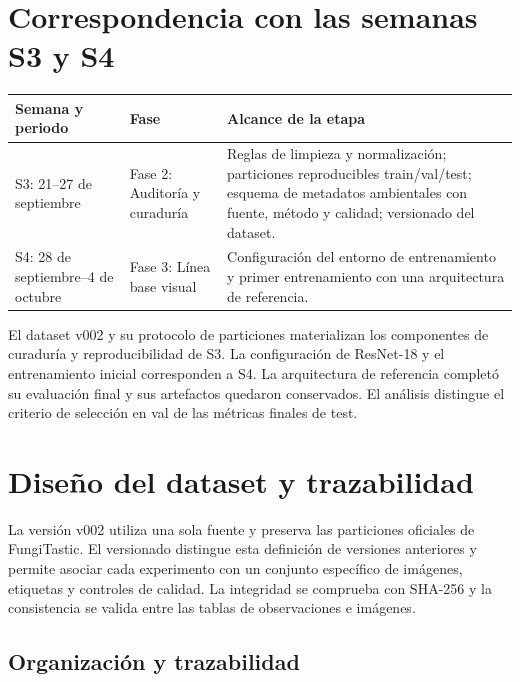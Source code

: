 \documentclass[11pt,a4paper]{article}
\begin{document}
\section{Correspondencia con las semanas S3 y S4}

\begin{center}
\small
\begin{tabularx}{\textwidth}{p{2.7cm}p{3.1cm}Y}
\toprule
\textbf{Semana y periodo} & \textbf{Fase} & \textbf{Alcance de la etapa}\\
\midrule
S3: 21--27 de septiembre & Fase 2: Auditoría y curaduría & Reglas de limpieza y
normalización; particiones reproducibles train/val/test; esquema de metadatos
ambientales con fuente, método y calidad; versionado del dataset.\\
S4: 28 de septiembre--4 de octubre & Fase 3: Línea base visual & Configuración
del entorno de entrenamiento y primer entrenamiento con una arquitectura de referencia.\\
\bottomrule
\end{tabularx}
\end{center}

El dataset v002 y su protocolo de particiones materializan los componentes de
curaduría y reproducibilidad de S3. La configuración de ResNet-18 y el
entrenamiento inicial corresponden a S4. La arquitectura de referencia completó
su evaluación final y sus artefactos quedaron conservados. El análisis distingue
el criterio de selección en val de las métricas finales de test.

\section{Diseño del dataset y trazabilidad}

La versión v002 utiliza una sola fuente y preserva las particiones oficiales de
FungiTastic. El versionado distingue esta definición de versiones anteriores y
permite asociar cada experimento con un conjunto específico de imágenes,
etiquetas y controles de calidad. La integridad se comprueba con SHA-256 y la
consistencia se valida entre las tablas de observaciones e imágenes.

\subsection{Organización y trazabilidad}
\end{document}
